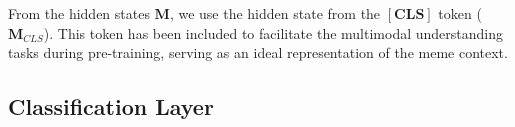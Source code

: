 From the hidden states $\mathbf{M}$, we use the hidden state from the $\mathbf{[CLS]}$ token ($\mathbf{M}_{CLS}$). This token has been included to facilitate the multimodal understanding tasks during pre-training, serving as an ideal representation of the meme context.






\subsection{Classification Layer}

